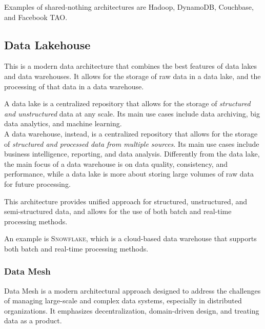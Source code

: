 Examples of shared-nothing architectures are Hadoop, DynamoDB, Couchbase, and Facebook TAO.

\subsection{Data Lakehouse}

This is a modern data architecture that combines the best features of data lakes and data warehouses. It allows for the storage of raw data in a data lake, and the processing of that data in a data warehouse.

A data lake is a centralized repository that allows for the storage of \textit{structured and unstructured} data at any scale. Its main use cases include data archiving, big data analytics, and machine learning.\\
A data warehouse, instead, is a centralized repository that allows for the storage of \textit{structured and processed data from multiple sources}. Its main use cases include business intelligence, reporting, and data analysis.
Differently from the data lake, the main focus of a data warehouse is on data quality, consistency, and performance, while a data lake is more about storing large volumes of raw data for future processing.


This architecture provides unified approach for structured, unstructured, and semi-structured data, and allows for the use of both batch and real-time processing methods.

An example is \textsc{Snowflake}, which is a cloud-based data warehouse that supports both batch and real-time processing methods.

\subsubsection{Data Mesh}
Data Mesh is a modern architectural approach designed to address the challenges of managing large-scale
and complex data systems, especially in distributed organizations. It emphasizes decentralization, domain-driven design, and treating data as a product.


